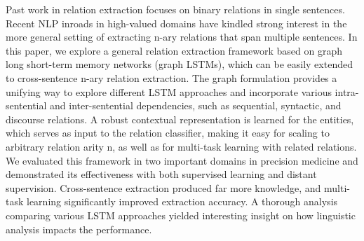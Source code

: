 Past work in relation extraction focuses on binary relations in single sentences. Recent NLP inroads in high-valued domains have kindled strong interest in the more general setting of extracting n-ary relations that span multiple sentences. In  this  paper,  we  explore  a  general relation extraction framework based on graph long short-term memory networks (graph LSTMs), which can be easily extended to cross-sentence n-ary relation extraction. The graph formulation provides a unifying way to explore different LSTM approaches and incorporate various  intra-sentential  and  inter-sentential  dependencies, such as sequential, syntactic, and discourse relations.  A robust contextual representation is learned for the entities, which serves as input to the relation classifier, making it easy for scaling to arbitrary relation arity n, as well as for multi-task learning with related  relations.   We  evaluated  this  framework in two important domains in precision medicine and demonstrated its effectiveness with both supervised learning and distant supervision. Cross-sentence extraction produced far more knowledge, and multi-task learning significantly improved extraction accuracy. A thorough analysis comparing various LSTM approaches yielded interesting insight on how linguistic analysis impacts the performance.